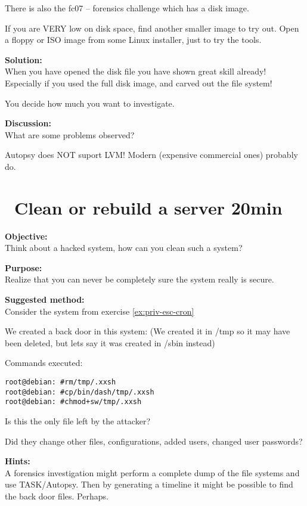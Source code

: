 \documentclass[a4paper,11pt,notitlepage]{report}
\begin{document}
There is also the fc07 -- forensics challenge which has a disk image.

If you are VERY low on disk space, find another smaller image to try out. Open a floppy or ISO image from some Linux installer, just to try the tools.

{\bf Solution:}\\
When you have opened the disk file you have shown great skill already! Especially if you used the full disk image, and carved out the file system!

You decide how much you want to investigate.

{\bf Discussion:}\\
What are some problems observed?

Autopsy does NOT suport LVM! Modern (expensive commercial ones) probably do.



\chapter{\faInfoCircle\ Clean or rebuild a server 20min}
\label{ex:clean-or-rebuild}


{\bf Objective:}\\
Think about a hacked system, how can you clean such a system?

{\bf Purpose:}\\
Realize that you can never be completely sure the system really is secure.

{\bf Suggested method:}\\
Consider the system from exercise \ref{ex:priv-esc-cron}

We created a back door in this system:
(We created it in /tmp so it may have been deleted, but lets say it was created in /sbin instead)

Commands executed:

\begin{alltt}
root@debian:~# rm /tmp/.xxsh
root@debian:~# cp /bin/dash /tmp/.xxsh
root@debian:~# chmod +sw /tmp/.xxsh
\end{alltt}

Is this the only file left by the attacker?

Did they change other files, configurations, added users, changed user passwords?

{\bf Hints:}\\
A forensics investigation might perform a complete dump of the file systems and use TASK/Autopsy. Then by generating a timeline it might be possible to find the back door files. Perhaps.
\end{document}
